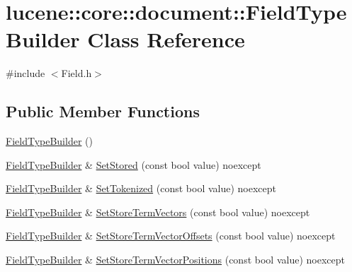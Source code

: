 \hypertarget{classlucene_1_1core_1_1document_1_1FieldTypeBuilder}{}\section{lucene\+:\+:core\+:\+:document\+:\+:Field\+Type\+Builder Class Reference}
\label{classlucene_1_1core_1_1document_1_1FieldTypeBuilder}


{\ttfamily \#include $<$Field.\+h$>$}

\subsection*{Public Member Functions}
\begin{DoxyCompactItemize}
\item 
\mbox{\hyperlink{classlucene_1_1core_1_1document_1_1FieldTypeBuilder_a7522c85b6ed23531fa0505461b34c723}{Field\+Type\+Builder}} ()
\item 
\mbox{\hyperlink{classlucene_1_1core_1_1document_1_1FieldTypeBuilder}{Field\+Type\+Builder}} \& \mbox{\hyperlink{classlucene_1_1core_1_1document_1_1FieldTypeBuilder_acfff42d8723b911f44099fbec4fc2f71}{Set\+Stored}} (const bool value) noexcept
\item 
\mbox{\hyperlink{classlucene_1_1core_1_1document_1_1FieldTypeBuilder}{Field\+Type\+Builder}} \& \mbox{\hyperlink{classlucene_1_1core_1_1document_1_1FieldTypeBuilder_aaae201d3c6f31cbeca7c5f2f782e0afa}{Set\+Tokenized}} (const bool value) noexcept
\item 
\mbox{\hyperlink{classlucene_1_1core_1_1document_1_1FieldTypeBuilder}{Field\+Type\+Builder}} \& \mbox{\hyperlink{classlucene_1_1core_1_1document_1_1FieldTypeBuilder_a506ea1479f84243ea0b46671ef39b4b9}{Set\+Store\+Term\+Vectors}} (const bool value) noexcept
\item 
\mbox{\hyperlink{classlucene_1_1core_1_1document_1_1FieldTypeBuilder}{Field\+Type\+Builder}} \& \mbox{\hyperlink{classlucene_1_1core_1_1document_1_1FieldTypeBuilder_abe98f545d7ef994171a11abd1318de67}{Set\+Store\+Term\+Vector\+Offsets}} (const bool value) noexcept
\item 
\mbox{\hyperlink{classlucene_1_1core_1_1document_1_1FieldTypeBuilder}{Field\+Type\+Builder}} \& \mbox{\hyperlink{classlucene_1_1core_1_1document_1_1FieldTypeBuilder_a598eeedd4fbfd6c2c945e6f4d1061159}{Set\+Store\+Term\+Vector\+Positions}} (const bool value) noexcept
\item 

\end{DoxyCompactItemize}
